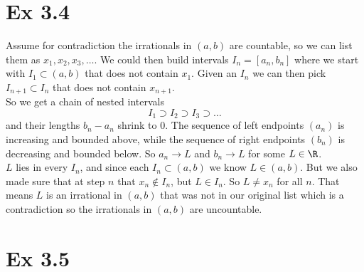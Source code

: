 \documentclass{report}
\begin{document}
\section*{Ex 3.4}


\begin{proofWithHibiscus}
  Assume for contradiction the irrationals in $(a,b)$ are countable, so we can list them as $x_1,x_2,x_3,\dots$. 
  We could then build intervals $I_n=[a_n,b_n]$ where we start with $I_1\subset(a,b)$ that does not contain $x_1$. 
  Given  an $I_n$ we can then pick $I_{n+1}\subset I_n$ that does not contain $x_{n+1}$.  \\

  So we get a chain of nested intervals 
  \[
    I_1 \supset I_2 \supset I_3 \supset \dots
  \] 
  and their lengths $b_n-a_n$ shrink to $0$. 
  The sequence of left endpoints $(a_n)$ is increasing and bounded above, while the sequence of right endpoints $(b_n)$ is decreasing and bounded below. 
  So $a_n \to L$ and $b_n \to L$ for some $L \in \R$. \\

  $L$ lies in every $I_n$, and since each $I_n \subset (a,b)$ we know $L \in (a,b)$. 
  But we also made sure that at step $n$ that $x_n \notin I_n$, but $L \in I_n$. 
  So $L \neq x_n$ for all $n$. 
  That means $L$ is an irrational in $(a,b)$ that was not in our original list which is a contradiction so the irrationals in $(a,b)$ are uncountable.
\end{proofWithHibiscus}


\section*{Ex 3.5}


\end{document}
